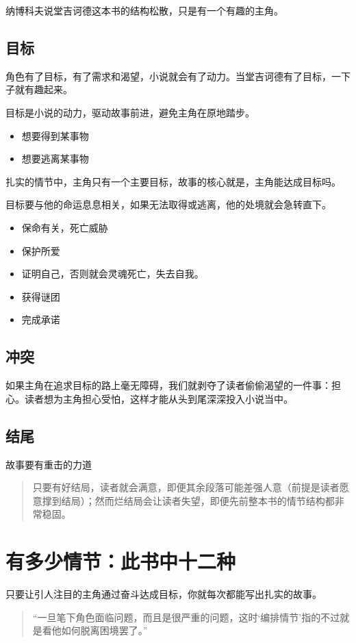 \documentclass[11pt, twoside, hidelinks]{memoir}
\begin{document}
纳博科夫说堂吉诃德这本书的结构松散，只是有一个有趣的主角。
\subsection{目标}
\label{sec:org938b4b7}
角色有了目标，有了需求和渴望，小说就会有了动力。当堂吉诃德有了目标，一下子就有趣起来。

目标是小说的动力，驱动故事前进，避免主角在原地踏步。

\begin{itemize}
\item 想要得到某事物
\item 想要逃离某事物
\end{itemize}


扎实的情节中，主角只有一个主要目标，故事的核心就是，主角能达成目标吗。

目标要与他的命运息息相关，如果无法取得或逃离，他的处境就会急转直下。
\begin{itemize}
\item 保命有关，死亡威胁
\item 保护所爱
\item 证明自己，否则就会灵魂死亡，失去自我。
\item 获得谜团
\item 完成承诺
\end{itemize}
\subsection{冲突}
\label{sec:orge332859}
如果主角在追求目标的路上毫无障碍，我们就剥夺了读者偷偷渴望的一件事：担心。读者想为主角担心受怕，这样才能从头到尾深深投入小说当中。
\subsection{结尾}
\label{sec:orged9b1de}
故事要有重击的力道

\begin{quote}
只要有好结局，读者就会满意，即便其余段落可能差强人意（前提是读者愿意撑到结局）；然而烂结局会让读者失望，即便先前整本书的情节结构都非常稳固。
\end{quote}
\section{有多少情节：此书中十二种}
\label{sec:orge2308e2}
只要让引人注目的主角通过奋斗达成目标，你就每次都能写出扎实的故事。

\begin{quote}
“一旦笔下角色面临问题，而且是很严重的问题，这时‘编排情节’指的不过就是看他如何脱离困境罢了。”
\end{quote}
\end{document}
